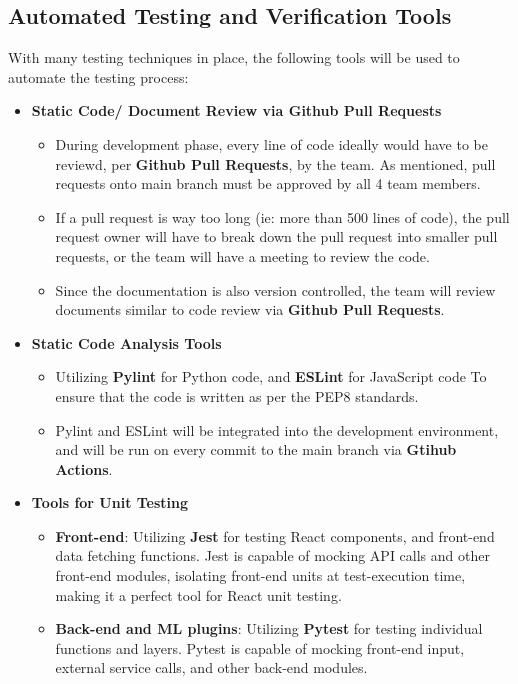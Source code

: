 \documentclass[12pt, titlepage]{article}
\begin{document}
\subsection{Automated Testing and Verification Tools}
With many testing techniques in place, the following tools will be used to automate the testing process:
\begin{itemize}
  \item[] {\textbf{Static Code/ Document Review via Github Pull Requests}}
  \begin{itemize}
    \item{During development phase, every line of code ideally would have to be reviewd, per \textbf{Github Pull Requests}, by the team. As mentioned, pull requests onto main branch must be approved by all 4 team members.}
    \item{If a pull request is way too long (ie: more than 500 lines of code), the pull request owner will have to break down the pull request into smaller pull requests, or the team will have a meeting to review the code.}
    \item{Since the documentation is also version controlled, the team will review documents similar to code review via \textbf{Github Pull Requests}.}
  \end{itemize}

  \item[] {\textbf{Static Code Analysis Tools}}
  \begin{itemize}
    \item{Utilizing \textbf{Pylint} for Python code, and \textbf{ESLint} for JavaScript code To ensure that the code is written as per the PEP8 standards.}
    \item{Pylint and ESLint will be integrated into the development environment, and will be run on every commit to the main branch via \textbf{Gtihub Actions}.}
  \end{itemize}

  \item[] {\textbf{Tools for Unit Testing}}
  \begin{itemize}
    \item{\textbf{Front-end}: Utilizing \textbf{Jest} for testing React components, and front-end data fetching functions. Jest is capable of mocking API calls and other front-end modules, isolating front-end units at test-execution time, making it a perfect tool for React unit testing.}
    \item{\textbf{Back-end and ML plugins}: Utilizing \textbf{Pytest} for testing individual functions and layers. Pytest is capable of mocking front-end input, external service calls, and other back-end modules.}
  \end{itemize}


\end{itemize}
\end{document}
